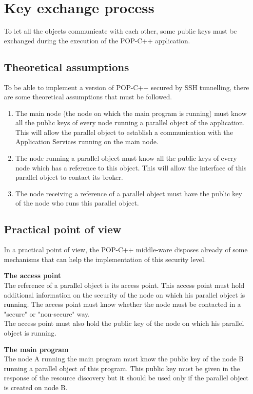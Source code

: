 \section{Key exchange process}
\label{chap:key_exchange}


To let all the objects communicate with each other, some public keys must be exchanged during the execution of the POP-C++ application. 
\subsection{Theoretical assumptions}
To be able to implement a version of POP-C++ secured by SSH tunnelling, there are some theoretical assumptions that must be followed.
\begin{enumerate}
\item The main node (the node on which the main program is running) must know all the public keys of every node running a parallel object of the application. This will allow the parallel object to establish a communication with the Application Services running on the main node.
\item The node running a parallel object must know all the public keys of every node which has a reference to this object. This will allow the interface of this parallel object to contact its broker.
\item The node receiving a reference of a parallel object must have the public key of the node who runs this parallel object.
\end{enumerate}




\subsection{Practical point of view}
In a practical point of view, the POP-C++ middle-ware disposes already of some mechanisms that can help the implementation of this security level.\s

\textbf{The access point}\\
The reference of a parallel object is its access point. This access point must hold additional information on the security of the node on which his parallel object is running. The access point must know whether the node must be contacted in a "secure" or "non-secure" way. \\
The access point must also hold the public key of the node on which his parallel object is running.\s

\textbf{The main program}\\
The node A running the main program must know the public key of the node B running a parallel object of this program. This public key must be given in the response of the resource discovery but it should be used only if the parallel object is created on node B.


